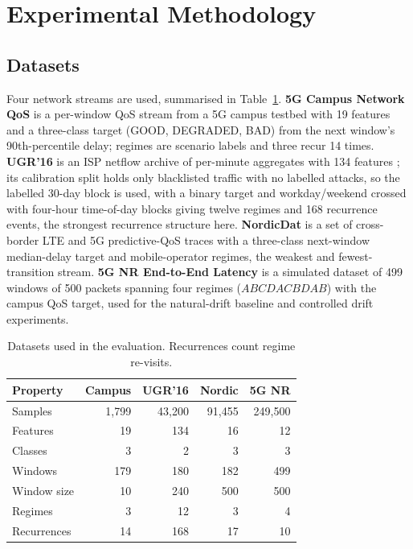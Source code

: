 \documentclass[conference]{IEEEtran}
\begin{document}
\section{Experimental Methodology}
\label{sec:protocol}

\subsection{Datasets}
Four network streams are used, summarised in Table~\ref{tab:datasets}.
\textbf{5G Campus Network QoS} is a per-window QoS stream from a 5G campus testbed
with 19 features and a three-class target (GOOD, DEGRADED, BAD) from the next
window's 90th-percentile delay; regimes are scenario labels and three recur 14 times.
\textbf{UGR'16} is an ISP netflow archive of per-minute aggregates with 134 features
\cite{ugr16}; its calibration split holds only blacklisted traffic with no labelled
attacks, so the labelled 30-day block is used, with a binary target and
workday/weekend crossed with four-hour time-of-day blocks giving twelve regimes and
168 recurrence events, the strongest recurrence structure here. \textbf{NordicDat}
is a set of cross-border LTE and 5G predictive-QoS traces \cite{nordicdat} with a
three-class next-window median-delay target and mobile-operator regimes, the weakest
and fewest-transition stream. \textbf{5G NR End-to-End Latency} is a simulated dataset
\cite{nrlatency} of 499 windows of 500 packets spanning four regimes ($ABCDACBDAB$)
with the campus QoS target, used for the natural-drift baseline and controlled drift
experiments.

\begin{table}[t]
\caption{Datasets used in the evaluation. Recurrences count regime re-visits.}
\label{tab:datasets}
\centering
\footnotesize
\begin{tabular}{@{}lrrrr@{}}
\toprule
\textbf{Property} & \textbf{Campus} & \textbf{UGR'16} & \textbf{Nordic} & \textbf{5G NR} \\
\midrule
Samples     & 1{,}799  & 43{,}200 & 91{,}455 & 249{,}500 \\
Features    & 19       & 134      & 16       & 12 \\
Classes     & 3        & 2        & 3        & 3 \\
Windows     & 179      & 180      & 182      & 499 \\
Window size & 10       & 240      & 500      & 500 \\
Regimes     & 3        & 12       & 3        & 4 \\
Recurrences & 14       & 168      & 17       & 10 \\
\bottomrule
\end{tabular}
\end{table}
\end{document}
